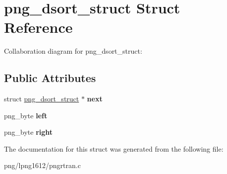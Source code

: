 \hypertarget{structpng__dsort__struct}{\section{png\+\_\+dsort\+\_\+struct Struct Reference}
\label{structpng__dsort__struct}
}


Collaboration diagram for png\+\_\+dsort\+\_\+struct\+:
\subsection*{Public Attributes}
\begin{DoxyCompactItemize}
\item 
\hypertarget{structpng__dsort__struct_a015adbadb5473fcf79d966c08229c900}{struct \hyperlink{structpng__dsort__struct}{png\+\_\+dsort\+\_\+struct} $\ast$ {\bfseries next}}\label{structpng__dsort__struct_a015adbadb5473fcf79d966c08229c900}

\item 
\hypertarget{structpng__dsort__struct_a09ba275bb5489f22e906be30b63f5452}{png\+\_\+byte {\bfseries left}}\label{structpng__dsort__struct_a09ba275bb5489f22e906be30b63f5452}

\item 
\hypertarget{structpng__dsort__struct_a9cfe3ab6de9319c0d18dd16075c21fa2}{png\+\_\+byte {\bfseries right}}\label{structpng__dsort__struct_a9cfe3ab6de9319c0d18dd16075c21fa2}

\end{DoxyCompactItemize}


The documentation for this struct was generated from the following file\+:\begin{DoxyCompactItemize}
\item 
png/lpng1612/pngrtran.\+c\end{DoxyCompactItemize}
